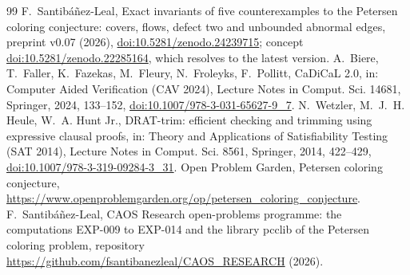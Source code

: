 \documentclass[11pt]{article}
\theoremstyle{definition}
\theoremstyle{remark}
\begin{document}
\begin{thebibliography}{99}
 F.~Santib\'a\~nez-Leal, Exact invariants of five counterexamples to the Petersen
coloring conjecture: covers, flows, defect two and unbounded abnormal edges,
preprint v0.07 (2026), \href{https://doi.org/10.5281/zenodo.24239715}{doi:10.5281/zenodo.24239715}; concept \href{https://doi.org/10.5281/zenodo.22285164}{doi:10.5281/zenodo.22285164}, which resolves to the latest version.
 A.~Biere, T.~Faller, K.~Fazekas, M.~Fleury, N.~Froleyks, F.~Pollitt, CaDiCaL 2.0,
in: Computer Aided Verification (CAV 2024), Lecture Notes in Comput. Sci. 14681, Springer, 2024,
133--152, \href{https://doi.org/10.1007/978-3-031-65627-9_7}{doi:10.1007/978-3-031-65627-9\_7}.
 N.~Wetzler, M.~J.~H. Heule, W.~A. Hunt Jr., DRAT-trim: efficient checking and
trimming using expressive clausal proofs, in: Theory and Applications of Satisfiability Testing
(SAT 2014), Lecture Notes in Comput. Sci. 8561, Springer, 2014, 422--429, \href{https://doi.org/10.1007/978-3-319-09284-3_31}{doi:10.1007/978-3-319-09284-3\_31}.
 Open Problem Garden, Petersen coloring conjecture,
\url{https://www.openproblemgarden.org/op/petersen_coloring_conjecture}.
 F.~Santib\'a\~nez-Leal, CAOS Research open-problems programme: the computations
EXP-009 to EXP-014 and the library pcclib of the Petersen coloring problem, repository
\url{https://github.com/fsantibanezleal/CAOS_RESEARCH} (2026).
\end{thebibliography}
\end{document}
